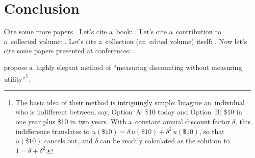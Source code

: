 


\blindmathfalse


\section{Conclusion}
\label{sec:Conclusion}

Cite some more papers \citep[see, e.g.,][]{Yaari1965, Warner2001, Davidoff2005, Benartzi2011}. Let's cite a~book: \cite{Luce1959}. Let's cite a~contribution to a~collected volume: \cite{Harrison2008}. Let's cite a~collection (an~edited volume) itself: \cite{Kagel2016}. Now let's cite some papers presented at conferences: \cite{Beute2012, Vosgerau2008}.

\cite{Attema2016} propose a~highly elegant method of ``measuring discounting without measuring utility''\footnote{The basic idea of their method is intriguingly simple: Imagine an~individual who is indifferent between, say, Option~A: \$10 today and Option~B: \$10 in one year plus \$10 in two years. With a~constant annual discount factor $\delta$, this indifference translates to $u(\$10) = \delta\,u(\$10) + \delta^2\,u(\$10)$, so that $u(\$10)$ cancels out, and $\delta$ can be readily calculated as the solution to $1 = {\delta + \delta^2}$.}. \blindtext